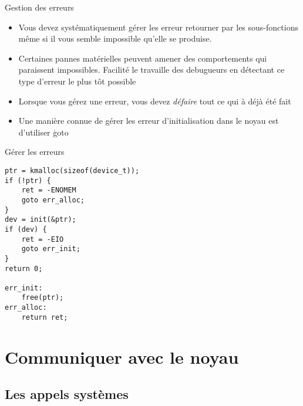 \begin{frame}[fragile=singleslide]{Gestion des erreurs}
  \begin{itemize} 
  \item Vous devez systématiquement gérer les erreur retourner par les
    sous-fonctions  même  si  il  vous semble  impossible  qu'elle  se
    produise.
  \item Certaines pannes  matérielles peuvent amener des comportements
    qui paraissent  impossibles. Facilité le  travaille des debugueurs
    en détectant ce type d'erreur le plus tôt possible
  \item Lorsque vous gérez  une erreur, vous devez \emph{défaire} tout
    ce qui à déjà été fait
  \item Une manière connue  de gérer les erreur d'initialisation dans
    le noyau est d'utiliser \c{goto}
  \end{itemize}
\end{frame}

\begin{frame}[fragile=singleslide]{Gérer les erreurs}
    \begin{lstlisting}
ptr = kmalloc(sizeof(device_t));
if (!ptr) {
    ret = -ENOMEM
    goto err_alloc;
}
dev = init(&ptr);
if (dev) {
    ret = -EIO
    goto err_init;
}
return 0;

err_init:
    free(ptr);
err_alloc:
    return ret;
    \end{lstlisting} 
\end{frame} 

\section{Communiquer avec le noyau}

\subsection{Les appels systèmes}

